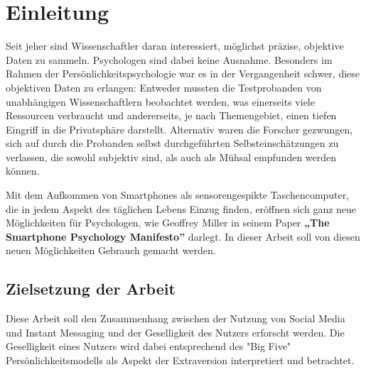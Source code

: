 
\chapter{Einleitung}
\label{ch:Einleitung}

Seit jeher sind Wissenschaftler daran interessiert, möglichst präzise, objektive Daten zu sammeln.
Psychologen sind dabei keine Ausnahme.
Besonders im Rahmen der Persönlichkeitspsychologie war es in der Vergangenheit schwer, diese objektiven Daten zu erlangen:
Entweder mussten die Testprobanden von unabhängigen Wissenschaftlern beobachtet werden,
was einerseits viele Ressourcen verbraucht und andererseits, je nach Themengebiet,
einen tiefen Eingriff in die Privatsphäre darstellt. Alternativ waren die Forscher gezwungen,
sich auf durch die Probanden selbst durchgeführten Selbsteinschätzungen zu verlassen,
die sowohl subjektiv sind, als auch als Mühsal empfunden werden können.\par

Mit dem Aufkommen von Smartphones als sensorengespikte Taschencomputer, die in jedem Aspekt des täglichen Lebens Einzug finden,
eröffnen sich ganz neue Möglichkeiten für Psychologen, wie Geoffrey Miller in seinem Paper \textbf{„The Smartphone Psychology Manifesto”} 
darlegt. In dieser Arbeit soll von diesen neuen Möglichkeiten Gebrauch gemacht werden.\par




\section{Zielsetzung der Arbeit}
\label{ch:Einleitung:sec:Zielsetzung}

Diese Arbeit soll den Zusammenhang zwischen der Nutzung von Social Media und Instant Messaging und der Geselligkeit des Nutzers erforscht werden.
Die Geselligkeit eines Nutzers wird dabei entsprechend des "Big Five" Persönlichkeitsmodells als Aspekt der Extraversion interpretiert und betrachtet.

